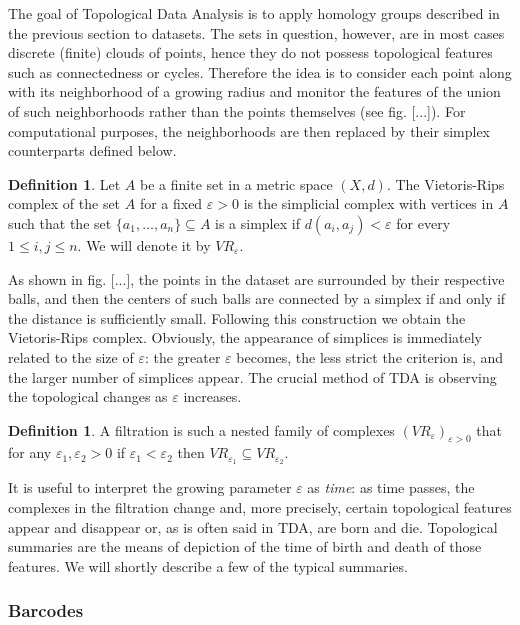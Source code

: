 \documentclass[12pt]{article}
\theoremstyle{plain}
\theoremstyle{definition}
\newtheorem{definition}[theorem]{Definition}
\theoremstyle{remark}
\begin{document}
	The goal of Topological Data Analysis is to apply homology groups described in the previous section to datasets. The sets in question, however, are in most cases discrete (finite) clouds of points, hence they do not possess topological features such as connectedness or cycles. Therefore the idea is to consider each point along with its neighborhood of a growing radius and monitor the features of the union of such neighborhoods rather than the points themselves (see fig. [...]). For computational purposes, the neighborhoods are then replaced by their simplex counterparts defined below.
	
	\begin{definition}
		Let $A$ be a finite set in a metric space $(X,d)$. The Vietoris-Rips complex of the set $A$ for a fixed $\varepsilon>0$ is the simplicial complex with vertices in $A$ such that the set $\{a_1, \dots, a_n\}\subseteq A$ is a simplex if $d(a_i,a_j)<\varepsilon$ for every $1\leqslant i, j\leqslant n$. We will denote it by $VR_\varepsilon$.
	\end{definition}

As shown in fig. [...], the points in the dataset are surrounded by their respective balls, and then the centers of such balls are connected by a simplex if and only if the distance is sufficiently small. Following this construction we obtain the Vietoris-Rips complex. Obviously, the appearance of simplices is immediately related to the size of $\varepsilon$: the greater $\varepsilon$ becomes, the less strict the criterion is, and the larger number of simplices appear. The crucial method of TDA is observing the topological changes as $\varepsilon$ increases.

\begin{definition}
	A filtration is such a nested family of complexes $(VR_\varepsilon)_{\varepsilon>0}$ that for any $\varepsilon_1, \varepsilon_2>0$ if $\varepsilon_1<\varepsilon_2$ then $VR_{\varepsilon_1} \subseteq VR_{\varepsilon_2}$.
\end{definition}

It is useful to interpret the growing parameter $\varepsilon$ as \textit{time}: as time passes, the complexes in the filtration change and, more precisely, certain topological features appear and disappear or, as is often said in TDA, are born and die. Topological summaries are the means of depiction of the time of birth and death of those features. We will shortly describe a few of the typical summaries.

\subsubsection{Barcodes}
\end{document}
